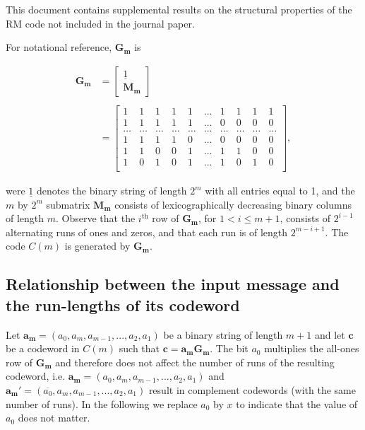 \documentclass[12pt]{article} \pagestyle{plain} \topmargin
\begin{document}
This document contains supplemental results on the structural
properties of the RM code not included in the journal paper.

For notational reference, $\mathbf{G_m}$ is

\begin{equation*}\label{eq:g}
 \begin{array}{lll} \mathbf{G_m} &=
\left[ \begin{array}{c} \underline{1} \\ \mathbf{M_m} \end{array} \right] \\
{} & {}\\
{} &=\left[ \begin{array}{cccccccccc}
1 & 1 & 1 & 1 & 1 & \ldots & 1 & 1 & 1 & 1 \\
1 & 1 & 1 & 1 & 1 & \ldots & 0 & 0 & 0 & 0 \\
\ldots & \ldots & \ldots & \ldots &\ldots &\ldots & \ldots & \ldots & \ldots &\ldots\\
1 & 1 & 1 & 1 & 0 & \ldots & 0 & 0 & 0 & 0 \\
1 & 1 & 0 & 0 & 1 & \ldots & 1 & 1 & 0 & 0 \\
1 & 0 & 1 & 0 & 1 & \ldots & 1 & 0 & 1 & 0\\
\end{array}\right],
\end{array}
\end{equation*}

\noindent were $\underline{1}$ denotes the binary string of length
$2^m$ with all entries equal to 1, and the $m$ by $2^m$ submatrix
$\mathbf{M_m}$ consists of lexicographically decreasing binary
columns of length $m$. Observe that the $i^{\text{th}}$ row of
$\mathbf{G_m}$, for $1 <i \leq m+1$, consists of $2^{i-1}$
alternating runs of ones and zeros, and that each run is of length
$2^{m-i+1}$. The code $C(m)$ is generated by $\mathbf{G_m}$.

\subsection{Relationship between the input message and the run-lengths of its
codeword}\label{sectionRM23}

Let $\mathbf{a_m}=(a_0,a_m,a_{m-1},...,a_2,a_1)$ be a binary string
of length $m+1$ and let $\mathbf{c}$ be a codeword in $C(m)$ such
that $\mathbf{c}=\mathbf{a_mG_m}$. The bit $a_0$ multiplies the
all-ones row of $\mathbf{G_m}$ and therefore does not affect the
number of runs of the resulting codeword, i.e.
$\mathbf{a_m}=(a_0,a_m,a_{m-1},...,a_2,a_1)$ and
$\mathbf{a_m}'=(\overline{a_0},a_m,a_{m-1},...,a_2,a_1)$ result in
complement codewords (with the same number of runs). In the
following we replace $a_0$ by $x$ to indicate that the value of
$a_0$ does not matter.
\end{document}
